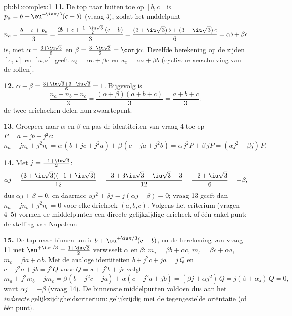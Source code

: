 \begin{solution}{pb:b1:complex:1}
\textbf{11.} De top naar buiten toe op $[b, c]$ is $p_a = b +
\eu^{-\iu\pi/3}(c - b)$ (vraag 3), zodat het middelpunt
\[
n_a = \frac{b + c + p_a}3
= \frac{2b + c + \frac{1 - \iu\sqrt3}2\,(c - b)}3
= \frac{(3 + \iu\sqrt3)\,b + (3 - \iu\sqrt3)\,c}6
= \alpha b + \beta c
\]
is, met $\alpha = \frac{3 + \iu\sqrt3}6$ en $\beta = \frac{3 -
\iu\sqrt3}6 = \conj\alpha$. Dezelfde berekening op de zijden $[c, a]$ en
$[a, b]$ geeft $n_b = \alpha c + \beta a$ en $n_c = \alpha a + \beta b$
(cyclische verschuiving van de rollen).

\textbf{12.} $\alpha + \beta = \frac{3 + \iu\sqrt3 + 3 - \iu\sqrt3}6 =
1$. Bijgevolg is
\[
\frac{n_a + n_b + n_c}3
= \frac{(\alpha + \beta)(a + b + c)}3 = \frac{a + b + c}3 :
\]
de twee driehoeken delen hun zwaartepunt.

\textbf{13.} Groepeer naar $\alpha$ en $\beta$ en pas de identiteiten van
vraag 4 toe op $P = a + jb + j^2c$:
\[
n_a + j n_b + j^2 n_c
= \alpha\,(b + jc + j^2 a) + \beta\,(c + ja + j^2 b)
= \alpha\,j^2 P + \beta\,j P
= (\alpha j^2 + \beta j)\,P .
\]

\textbf{14.} Met $j = \frac{-1 + \iu\sqrt3}2$:
\[
\alpha j = \frac{(3 + \iu\sqrt3)(-1 + \iu\sqrt3)}{12}
= \frac{-3 + 3\iu\sqrt3 - \iu\sqrt3 - 3}{12}
= \frac{-3 + \iu\sqrt3}6 = -\beta ,
\]
dus $\alpha j + \beta = 0$, en daarmee $\alpha j^2 + \beta j = j(\alpha j
+ \beta) = 0$; vraag 13 geeft dan $n_a + jn_b + j^2n_c = 0$ voor elke
driehoek $(a, b, c)$. Volgens het criterium (vragen 4--5) vormen de
middelpunten een directe gelijkzijdige driehoek of één enkel punt: de
stelling van Napoleon.

\textbf{15.} De top naar binnen toe is $b + \eu^{+\iu\pi/3}(c - b)$, en
de berekening van vraag 11 met $\eu^{+\iu\pi/3} = \frac{1 +
\iu\sqrt3}2$ verwisselt $\alpha$ en $\beta$: $m_a = \beta b + \alpha c$,
$m_b = \beta c + \alpha a$, $m_c = \beta a + \alpha b$. Met de analoge
identiteiten $b + j^2c + ja = j\,Q$ en $c + j^2a + jb = j^2 Q$ voor $Q =
a + j^2b + jc$ volgt
\[
m_a + j^2 m_b + j m_c
= \beta(b + j^2 c + ja) + \alpha(c + j^2 a + jb)
= (\beta j + \alpha j^2)\, Q = j(\beta + \alpha j)\,Q = 0 ,
\]
want $\alpha j = -\beta$ (vraag 14). De binnenste middelpunten voldoen
dus aan het \emph{indirecte} gelijkzijdigheidscriterium: gelijkzijdig met
de tegengestelde oriëntatie (of één punt).


\end{solution}
